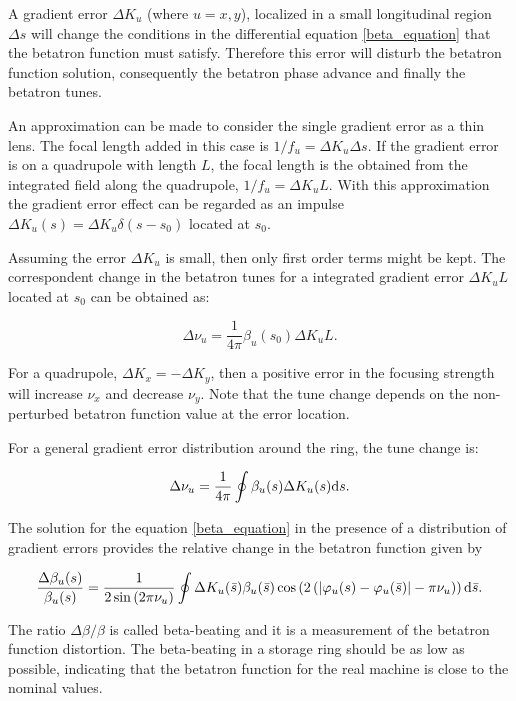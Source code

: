 A gradient error $\Delta K_u$ (where $u=x, y$), localized in a small longitudinal region $\Delta s$ will change the conditions in the differential equation \eqref{beta_equation} that the betatron function must satisfy. Therefore this error will disturb the betatron function solution, consequently the betatron phase advance and finally the betatron tunes.

An approximation can be made to consider the single gradient error as a thin lens. The focal length added in this case is $1/f_u = \Delta K_u \Delta s$. If the gradient error is on a quadrupole with length $L$, the focal length is the obtained from the integrated field along the quadrupole, $1/f_u = \Delta K_u L$. With this approximation the gradient error effect can be regarded as an impulse $\Delta K_u(s) = \Delta K_u \delta(s-s_0)$ located at $s_0$.

Assuming the error $\Delta K_u$ is small, then only first order terms might be kept. The correspondent change in the betatron tunes for a integrated gradient error $\Delta K_u L$ located at $s_0$ can be obtained as:

\begin{equation}
    \Delta \nu_u = \dfrac{1}{4 \pi} \beta_u (s_0) \Delta K_u L.
\end{equation}

For a quadrupole, $\Delta K_x = - \Delta K_y$, then a positive error in the focusing strength will increase $\nu_x$ and decrease $\nu_y$. Note that the tune change depends on the non-perturbed betatron function value at the error location.

For a general gradient error distribution around the ring, the tune change is:

\begin{equation}
    \Delta \nu_u = \dfrac{1}{4 \pi} \oint \beta_u ({s}) \Delta K_u ({s})\mathrm{d} {s}.
\end{equation}

The solution for the equation \eqref{beta_equation} in the presence of a distribution of gradient errors provides the relative change in the betatron function given by

\begin{equation}
    \dfrac{\Delta \beta_u(s)}{\beta_u(s)} = \dfrac{1}{2\sin\left(2\pi \nu_u\right)} \oint \Delta K_u(\bar{s}) \beta_u(\bar{s}) \cos\left(2\left(|\varphi_{u}(s) - \varphi_{u}(\bar{s})| - \pi\nu_{u} \right)\right) \mathrm{d} \bar{s}.
\end{equation}

The ratio $\Delta \beta/\beta$ is called beta-beating and it is a measurement of the betatron function distortion. The beta-beating in a storage ring should be as low as possible, indicating that the betatron function for the real machine is close to the nominal values.

